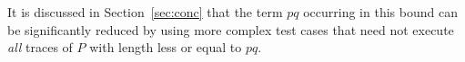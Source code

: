  
It is discussed in Section~\ref{sec:conc} that the term $pq$ occurring in this bound can be significantly reduced by using more complex test cases that need not execute {\it all} 
traces of $P$ with length less or equal to $pq$.












